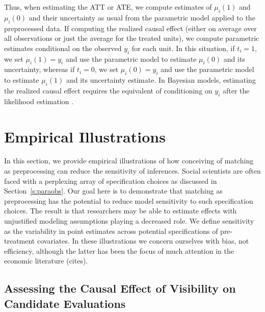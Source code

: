 \documentclass[11pt,titlepage]{article}
\begin{document}
Thus, when estimating the ATT or ATE, we compute estimates of
$\mu_i(1)$ and $\mu_i(0)$ and their uncertainty as usual from the
parametric model applied to the preprocessed data.  If computing the
realized causal effect (either on average over all observations or
just the average for the treated units), we compute parametric
estimates conditional on the observed $y_i$ for each unit.  In this
situation, if $t_i=1$, we set $\mu_i(1)=y_i$ and use the parametric
model to estimate $\mu_i(0)$ and its uncertainty, whereas if $t_i=0$,
we set $\mu_i(0)=y_i$ and use the parametric model to estimate
$\mu_i(1)$ and its uncertainty estimate.  In Bayesian models,
estimating the realized causal effect requires the equivalent of
conditioning on $y_i$ after the likelihood estimation \citep[as
in][]{King97}.

\section{Empirical Illustrations}

In this section, we provide empirical illustrations of how conceiving
of matching as preprocessing can reduce the sensitivity of inferences.
Social scientists are often faced with a perplexing array of
specification choices as discussed in Section~\ref{s:paraobs}.  Our
goal here is to demonstrate that matching as preprocessing has the
potential to reduce model sensitivity to such specification choices.
The result is that researchers may be able to estimate effects with
unjustified modeling assumptions playing a decreased role.  We define
sensitivity as the variability in point estimates across potential
specifications of pre-treatment covariates.  In these illustrations we
concern ourselves with bias, not efficiency, although the latter has
been the focus of much attention in the economic literature (cites).

\subsection{Assessing the Causal Effect of Visibility on Candidate
  Evaluations}
\end{document}
